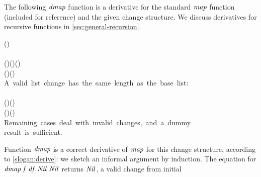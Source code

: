 The following \ensuremath{\Varid{dmap}} function is a derivative for the
standard \ensuremath{\Varid{map}} function (included for reference) and the given
change structure. We discuss derivatives for recursive functions
in \cref{sec:general-recursion}.
\begin{hscode}\SaveRestoreHook
{}%
%
%
\>[B]{}\typcolon(\to {})\to {}\;\to {}\;\<[E]%
\\
\>[B]{}\;\;\mathrel{=}\<[E]%
\\
\>[B]{}\;\;(\;\;)\mathrel{=}\;(\;)\;(\;\;){}\<[E]%
\\[\blanklineskip]%
\>[B]{}\typcolon(\to {})\to \Delta (\to {})\to {}\;\to \Delta {}\;\to \Delta {}\;\<[E]%
\\
\>[B]{}\mbox{\onelinecomment  A valid list change has the same length as the base list:}{}\<[E]%
\\
\>[B]{}\;\;\;\;\mathrel{=}\<[E]%
\\
\>[B]{}\;\;\;(\;\;)\;(\;\;)\mathrel{=}{}\<[E]%
\\
\>[B]{}\<[3]%
\>[3]{}\;(\;\;)\;(\;\;\;\;){}\<[E]%
\\
\>[B]{}\mbox{\onelinecomment  Remaining cases deal with invalid changes, and a dummy}{}\<[E]%
\\
\>[B]{}\mbox{\onelinecomment  result is sufficient.}{}\<[E]%
\\
\>[B]{}\;\;\;\;\mathrel{=}\<[E]%
\ColumnHook
\end{hscode}\resethooks
Function \ensuremath{\Varid{dmap}} is a correct derivative of \ensuremath{\Varid{map}} for this change structure,
according to \cref{slogan:derive}: we sketch an informal argument by induction.
The equation for \ensuremath{\Varid{dmap}\;\Varid{f}\;\Varid{df}\;\Conid{Nil}\;\Conid{Nil}} returns \ensuremath{\Conid{Nil}}, a valid change from initial
